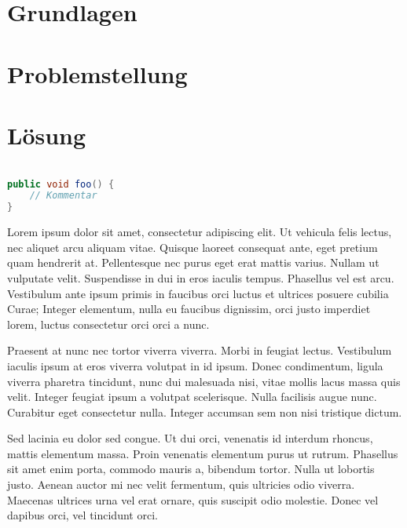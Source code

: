 \documentclass[12pt,oneside,a4paper,parskip]{scrbook}
\begin{document}
\cite{gamma2011patterns}

\cite{Alleman2006}

\chapter{Grundlagen}

\chapter{Problemstellung}

\chapter{Lösung}

\begin{lstlisting}[label=lst:java,
				   language=java,
				   firstnumber=1,
				   caption=Beispiel für einen Quelltext]				   

public void foo() {				   
	// Kommentar
}
\end{lstlisting}

Lorem ipsum dolor sit amet, consectetur adipiscing elit. Ut vehicula felis lectus, nec aliquet arcu aliquam vitae. Quisque laoreet consequat ante, eget pretium quam hendrerit at. Pellentesque nec purus eget erat mattis varius. Nullam ut vulputate velit. Suspendisse in dui in eros iaculis tempus. Phasellus vel est arcu. Vestibulum ante ipsum primis in faucibus orci luctus et ultrices posuere cubilia Curae; Integer elementum, nulla eu faucibus dignissim, orci justo imperdiet lorem, luctus consectetur orci orci a nunc.

Praesent at nunc nec tortor viverra viverra. Morbi in feugiat lectus. Vestibulum iaculis ipsum at eros viverra volutpat in id ipsum. Donec condimentum, ligula viverra pharetra tincidunt, nunc dui malesuada nisi, vitae mollis lacus massa quis velit. Integer feugiat ipsum a volutpat scelerisque. Nulla facilisis augue nunc. Curabitur eget consectetur nulla. Integer accumsan sem non nisi tristique dictum.

Sed lacinia eu dolor sed congue. Ut dui orci, venenatis id interdum rhoncus, mattis elementum massa. Proin venenatis elementum purus ut rutrum. Phasellus sit amet enim porta, commodo mauris a, bibendum tortor. Nulla ut lobortis justo. Aenean auctor mi nec velit fermentum, quis ultricies odio viverra. Maecenas ultrices urna vel erat ornare, quis suscipit odio molestie. Donec vel dapibus orci, vel tincidunt orci.
\end{document}
